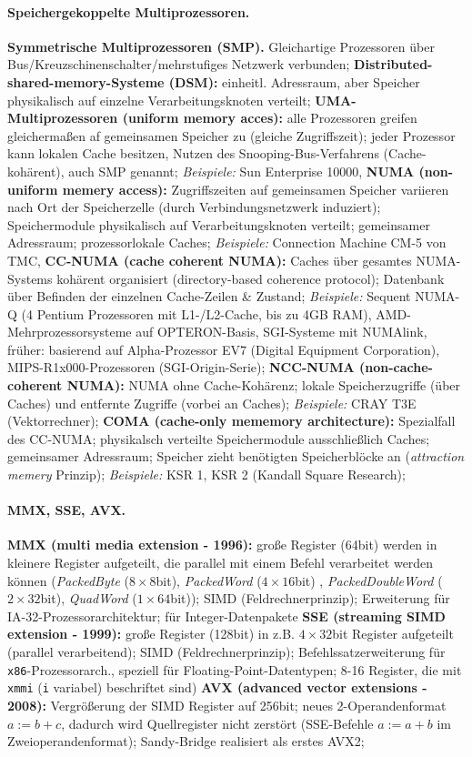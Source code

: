 \documentclass[8pt,a4paper]{article}
\begin{document}
\begin{multicols}{2}
\paragraph{Speichergekoppelte Multiprozessoren.} \textbf{Symmetrische Multiprozessoren (SMP).} Gleichartige Prozessoren über Bus/Kreuzschinenschalter/mehrstufiges Netzwerk verbunden; 
\textbf{Distributed-shared-memory-Systeme (DSM):} einheitl. Adressraum, aber Speicher physikalisch auf einzelne Verarbeitungsknoten verteilt; \textbf{UMA-Multiprozessoren (uniform memory acces):} alle Prozessoren greifen gleichermaßen af gemeinsamen Speicher zu (gleiche Zugriffszeit); jeder Prozessor kann lokalen Cache besitzen, Nutzen des Snooping-Bus-Verfahrens (Cache-kohärent), auch SMP genannt; \emph{Beispiele:} Sun Enterprise 10000, \textbf{NUMA (non-uniform memery access):} Zugriffszeiten auf gemeinsamen Speicher variieren nach Ort der Speicherzelle (durch Verbindungsnetzwerk induziert); Speichermodule physikalisch auf Verarbeitungsknoten verteilt; gemeinsamer Adressraum; prozessorlokale Caches; \emph{Beispiele:} Connection Machine CM-5 von TMC,  \textbf{CC-NUMA (cache coherent NUMA):} Caches über gesamtes NUMA-Systems kohärent organisiert (directory-based coherence protocol); Datenbank über Befinden der einzelnen Cache-Zeilen \& Zustand; \emph{Beispiele:} Sequent NUMA-Q (4 Pentium Prozessoren mit L1-/L2-Cache, bis zu 4GB RAM), AMD-Mehrprozessorsysteme auf OPTERON-Basis, SGI-Systeme mit NUMAlink, früher: basierend auf Alpha-Prozessor EV7 (Digital Equipment Corporation), MIPS-R1x000-Prozessoren (SGI-Origin-Serie); \textbf{NCC-NUMA (non-cache-coherent NUMA):} NUMA ohne Cache-Kohärenz; lokale Speicherzugriffe (über Caches) und entfernte Zugriffe (vorbei an Caches); \emph{Beispiele:} CRAY T3E (Vektorrechner); \textbf{COMA (cache-only mememory architecture):} Spezialfall des CC-NUMA; physikalsch verteilte Speichermodule ausschließlich Caches; gemeinsamer Adressraum; Speicher zieht benötigten Speicherblöcke an (\emph{attraction memery} Prinzip); \emph{Beispiele:} KSR 1, KSR 2 (Kandall Square Research);

\paragraph{MMX, SSE, AVX.} \textbf{MMX (multi media extension - 1996):} große Register (64bit) werden
in kleinere Register aufgeteilt, die parallel mit
einem Befehl verarbeitet werden können (\emph{PackedByte} ($8\times 8$bit),
\emph{PackedWord} ($4\times 16$bit) , \emph{PackedDoubleWord}
($2\times32$bit), \emph{QuadWord} ($1\times 64$bit)); SIMD (Feldrechnerprinzip);
Erweiterung für IA-32-Prozessorarchitektur; für Integer-Datenpakete \textbf{SSE (streaming
  SIMD extension - 1999):} große Register (128bit) in
z.B. $4\times32$bit Register aufgeteilt (parallel verarbeitend); SIMD
(Feldrechnerprinzip); Befehlssatzerweiterung für
\texttt{x86}-Prozessorarch., speziell für Floating-Point-Datentypen;
8-16 Register, die mit \texttt{xmmi} (\texttt{i} variabel) beschriftet sind)
\textbf{AVX (advanced vector extensions - 2008):} Vergrößerung der
SIMD Register auf 256bit; neues 2-Operandenformat $a:=b+c$, dadurch
wird Quellregister nicht zerstört (SSE-Befehle $a:=a+b$ im Zweioperandenformat); Sandy-Bridge realisiert als erstes AVX2;


\end{multicols}
\end{document}
